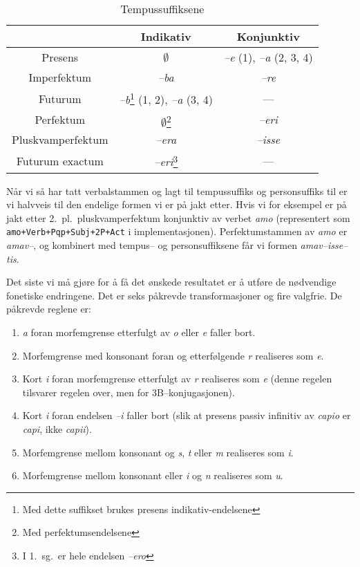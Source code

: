 \documentclass[a4paper]{article}
\begin{document}
\begin{savenotes}
\begin{table}[hp]
\begin{center}
\begin{tabular}{|c|c|c|}
    \hline
                  & Indikativ   & Konjunktiv \\
    \hline
Presens           & $\emptyset$ & \emph{--e} (1), \emph{--a} (2, 3, 4) \\
Imperfektum       & \emph{--ba} & \emph{--re} \\
Futurum           & \emph{--b}\footnote{Med dette suffikset brukes presens
indikativ-endelsene} (1, 2), \emph{--a} (3, 4) & --- \\
    \hline
Perfektum         & $\emptyset$\footnote{Med perfektumsendelsene} & \emph{--eri} \\
Pluskvamperfektum & \emph{--era} & \emph{--isse} \\
Futurum exactum   & \emph{--eri}\footnote{I 1.~sg.~er hele endelsen
\emph{--ero}} & ---        \\
    \hline
\end{tabular}
\caption{Tempussuffiksene}
\label{tempus}
\end{center}
\end{table}
\end{savenotes}

N\aa{}r vi s\aa{} har tatt verbalstammen og lagt til tempussuffiks og
personsuffiks til er vi halvveis til den endelige formen vi er p\aa{} jakt
etter. Hvis vi for eksempel er p\aa{} jakt etter 2.~pl.~pluskvamperfektum
konjunktiv av verbet \emph{amo} (representert som
\texttt{amo+Verb+Pqp+Subj+2P+Act} i implementasjonen). Perfektumstammen av
\emph{amo} er \emph{amav--}, og kombinert med tempus-- og personsuffiksene
f\aa{}r vi formen \emph{amav--isse--tis}.

Det siste vi m\aa{} gj\o{}re for \aa{} f\aa{} det \o{}nskede resultatet er
\aa{} utf\o{}re de n\o{}dvendige fonetiske endringene. Det er seks
p\aa{}krevde transformasjoner og fire valgfrie. De p\aa{}krevde reglene er:
\begin{enumerate}
\item \emph{a} foran morfemgrense etterfulgt av \emph{o} eller \emph{e} faller
bort.

\item Morfemgrense med konsonant foran og etterf\o{}lgende \emph{r} realiseres
som \emph{e}.

\item Kort \emph{i} foran morfemgrense etterfulgt av \emph{r} realiseres som
\emph{e} (denne regelen tilsvarer regelen over, men for 3B--konjugasjonen).

\item Kort \emph{i} foran endelsen \emph{--i} faller bort (slik at presens
passiv infinitiv av \emph{capio} er \emph{capi}, ikke \emph{capii}).

\item Morfemgrense mellom konsonant og \emph{s}, \emph{t} eller \emph{m}
realiseres som \emph{i}.

\item Morfemgrense mellom konsonant eller \emph{i} og \emph{n} realiseres som
\emph{u}.
\end{enumerate}
\end{document}
